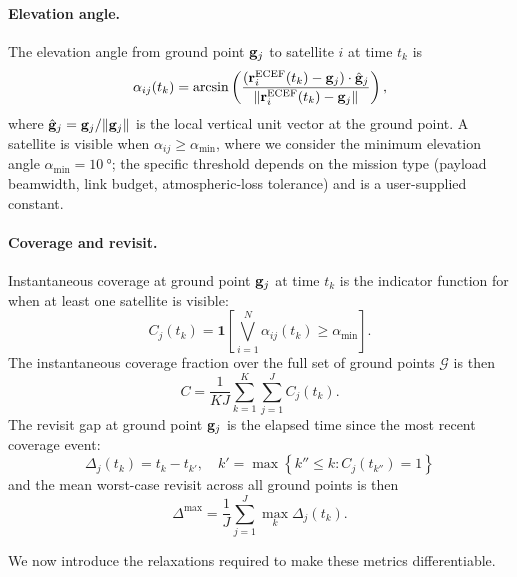 \paragraph{Elevation angle.}
The elevation angle from ground point $\mathbf{g}_j$ to satellite $i$ at time $t_k$ is
\begin{equation}
    \alpha_{ij}(t_k) = \arcsin\left(\frac{(\mathbf{r}_i^{\text{ECEF}}(t_k) - \mathbf{g}_j) \cdot \hat{\mathbf{g}}_j}{\|\mathbf{r}_i^{\text{ECEF}}(t_k) - \mathbf{g}_j\|}\right),
    \label{eq:elevation}
\end{equation}
where $\hat{\mathbf{g}}_j = \mathbf{g}_j / \|\mathbf{g}_j\|$ is the local vertical unit vector at the ground point.
A satellite is visible when $\alpha_{ij} \geq \alpha_{\min}$, where we consider the minimum elevation angle $\alpha_{\min} = \SI{10}{\degree}$; the specific threshold depends on the mission type (payload beamwidth, link budget, atmospheric-loss tolerance) and is a user-supplied constant.

\paragraph{Coverage and revisit.}

Instantaneous coverage at ground point $\mathbf{g}_j$ at time $t_k$ is the indicator function for when at least one satellite is visible: 
\begin{equation}
    C_j(t_k) = \mathbf{1}\!\left[\bigvee_{i=1}^{N} \alpha_{ij}(t_k) \geq \alpha_{\min}\right].
    \label{eq:coverage}
\end{equation}
The instantaneous coverage fraction over the full set of ground points $\mathcal{G}$ is then
\begin{equation}
    C = \frac{1}{KJ} \sum_{k=1}^{K} \sum_{j=1}^{J} C_j(t_k).
    \label{eq:coverage_fraction_hard}
\end{equation}
The revisit gap at ground point $\mathbf{g}_j$ is the elapsed time since the most recent coverage event:
\begin{equation} 
 \Delta_j(t_k) = t_k - t_{k'}, \quad k' = \max\left\{k'' \leq k : C_j(t_{k''}) = 1\right\}
    \label{eq:revisit}
\end{equation}
and the mean worst-case revisit across all ground points is then
\begin{equation}
    \Delta^{\max} = \frac{1}{J} \sum_{j=1}^{J} \max_k \Delta_j(t_k).
    \label{eq:mean_revisit_hard}
\end{equation}

We now introduce the relaxations required to make these metrics differentiable.

